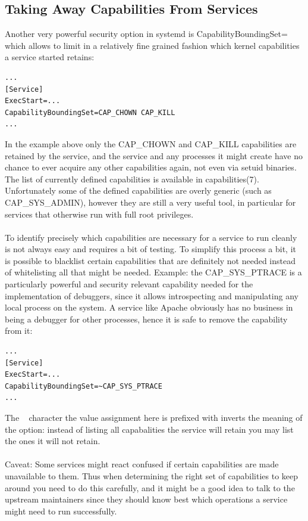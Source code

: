 \documentclass[titlepage]{article}
\begin{document}
\subsection{Taking Away Capabilities From Services}
Another very powerful security option in systemd is CapabilityBoundingSet= which allows to limit in a relatively fine grained fashion which kernel capabilities a service started retains:
\begin{lstlisting}
...
[Service]
ExecStart=...
CapabilityBoundingSet=CAP_CHOWN CAP_KILL
...
\end{lstlisting}
In the example above only the CAP\_CHOWN and CAP\_KILL capabilities are retained by the service, and the service and any processes it might create have no chance to ever acquire any other capabilities again, not even via setuid binaries. The list of currently defined capabilities is available in capabilities(7). Unfortunately some of the defined capabilities are overly generic (such as CAP\_SYS\_ADMIN), however they are still a very useful tool, in particular for services that otherwise run with full root privileges.
\\
\\
To identify precisely which capabilities are necessary for a service to run cleanly is not always easy and requires a bit of testing. To simplify this process a bit, it is possible to blacklist certain capabilities that are definitely not needed instead of whitelisting all that might be needed. Example: the CAP\_SYS\_PTRACE is a particularly powerful and security relevant capability needed for the implementation of debuggers, since it allows introspecting and manipulating any local process on the system. A service like Apache obviously has no business in being a debugger for other processes, hence it is safe to remove the capability from it:
\begin{lstlisting}
...
[Service]
ExecStart=...
CapabilityBoundingSet=~CAP_SYS_PTRACE
...
\end{lstlisting}
The ~ character the value assignment here is prefixed with inverts the meaning of the option: instead of listing all capabalities the service will retain you may list the ones it will not retain.
\\
\\
Caveat: Some services might react confused if certain capabilities are made unavailable to them. Thus when determining the right set of capabilities to keep around you need to do this carefully, and it might be a good idea to talk to the upstream maintainers since they should know best which operations a service might need to run successfully.
\end{document}
